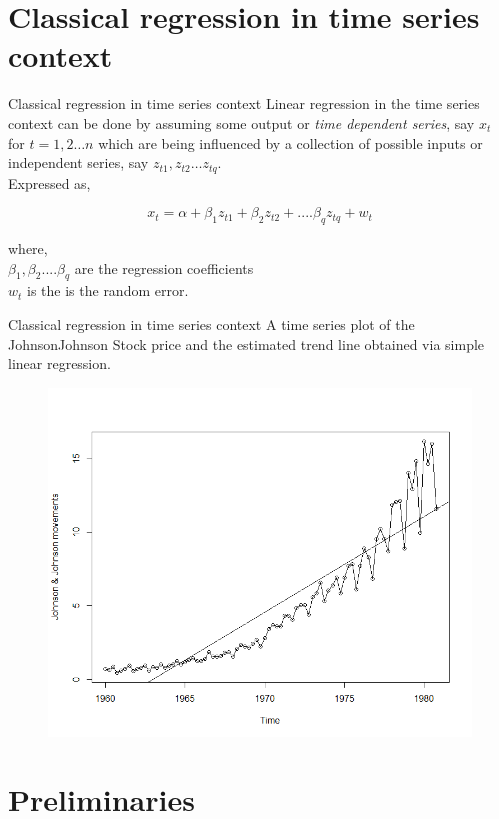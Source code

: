 \documentclass{beamer}
\begin{document}
\section{Classical regression in time series context}
\begin{frame}{Classical regression in time series context}
	Linear regression in the time series context can be done by assuming some output or \textit{time dependent series}, say $ x_t $ for $ t = 1,2 \dots n $ which are being influenced by a collection of possible inputs or independent series, say $ z_{t1}, z_{t2} \dots z_{tq} $. \\
	
	Expressed as, 
	
	\begin{equation}
	x_{t}=\alpha+ \beta_{1}z_{t1}+\beta_{2}z_{t2}+....\beta_{q}z_{tq}+w_{t}  
	\end{equation}

where,\\
$ \beta_1,\beta_2 .... \beta_q $ are the regression coefficients\\
$ w_t $ is the is the random error. \\
		
\end{frame}


\begin{frame}{Classical regression in time series context}
A time series plot of the JohnsonJohnson  Stock price and the estimated trend line obtained via simple linear regression. 
\begin{figure}
[h]
\includegraphics[width=0.7\linewidth]{../Beamer/linearreg}
\end{figure}
	
\end{frame}

\section{Preliminaries}
\end{document}
